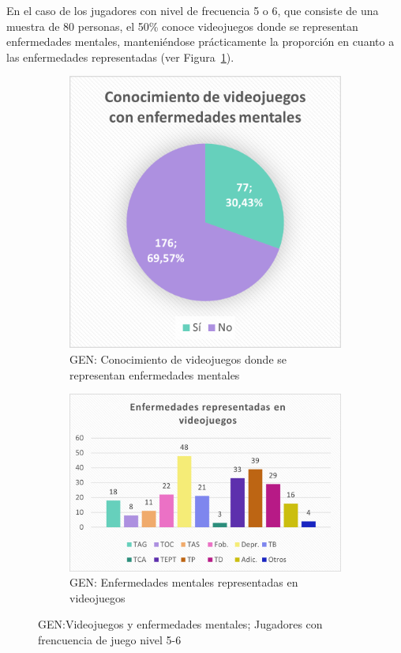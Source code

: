 \documentclass[12pt, a4paper,twoside,titlepage]{book}
\begin{document}
En el caso de los jugadores con nivel de frecuencia 5 o 6, que consiste de una muestra de 80 personas, el 50\% conoce videojuegos donde se representan enfermedades mentales, manteniéndose prácticamente la proporción en cuanto a las enfermedades representadas (ver Figura~\ref{fig:Convid56}).


\begin{figure}
\centering
\begin{subfigure}{.4\textwidth}
  \centering
  \includegraphics[width=.95\linewidth]{Imagenes Form GEN/7GENConenf}
  \caption{GEN: Conocimiento de videojuegos donde se representan enfermedades mentales}
\end{subfigure}%
\begin{subfigure}{.6\textwidth}
  \centering
  \includegraphics[width=.95\linewidth]{Imagenes Form GEN/8GENConenf}
  \caption{GEN: Enfermedades mentales representadas en videojuegos}
\end{subfigure}
\caption{GEN:Videojuegos y enfermedades mentales; Jugadores con frencuencia de juego nivel 5-6}
\label{fig:Convid56}
\end{figure}
\end{document}

